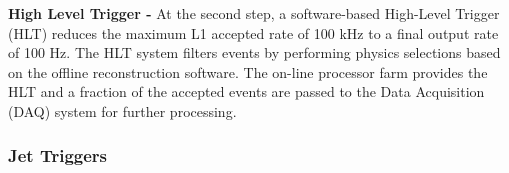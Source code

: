 {\bf High Level Trigger -} At the second step, a software-based High-Level Trigger (HLT) reduces the maximum L1 accepted rate of 100 kHz to a final output rate of 100 Hz. The HLT system filters events by performing physics selections based on the offline reconstruction software. The on-line processor farm provides the HLT and a fraction of the accepted events are passed to the Data Acquisition (DAQ) system for further processing.

\subsubsection{Jet Triggers}
\begin{comment}
\begin{figure}[!h]
\begin{center}
\vspace*{3mm} 
\hspace*{-5mm}
\texttt{[image: /home/anter/Desktop/Thesis/Figures/Jet\_trigger.png]}\\
\vspace*{4mm}
\caption[Muon]{Illustration of the available tower granularity for the L1 jet finding algorithm in the
central region, |η|<3 (left). The jet trigger uses a 3×3 calorimeter region sliding window technique which spans the full(η,φ)coverage of the calorimeter. The active tower patterns allowed for L1τjet candidates are shown on the right Work flow of the L1 trigger system \cite{Chatrchyan:2008aa}.}
\label{fig:Jettrigger}
\end{center}
\end{figure}
\end{comment}

